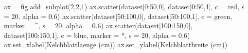 \documentclass[
  a4paper,
  DIV=11]{scrreprt}
\newenvironment{Shaded}{\begin{snugshade}}{\end{snugshade}}
\newcommand{\DecValTok}[1]{\textcolor[rgb]{0.68,0.00,0.00}{#1}}
\newcommand{\FloatTok}[1]{\textcolor[rgb]{0.68,0.00,0.00}{#1}}
\newcommand{\NormalTok}[1]{\textcolor[rgb]{0.00,0.23,0.31}{#1}}
\newcommand{\OperatorTok}[1]{\textcolor[rgb]{0.37,0.37,0.37}{#1}}
\newcommand{\StringTok}[1]{\textcolor[rgb]{0.13,0.47,0.30}{#1}}
\theoremstyle{definition}
\theoremstyle{definition}
\theoremstyle{remark}
\begin{document}
\begin{Shaded}
\begin{Highlighting}[]
\NormalTok{ax }\OperatorTok{=}\NormalTok{ fig.add\_subplot(}\DecValTok{2}\NormalTok{,}\DecValTok{2}\NormalTok{,}\DecValTok{1}\NormalTok{)}
\NormalTok{ax.scatter(dataset[}\DecValTok{0}\NormalTok{:}\DecValTok{50}\NormalTok{,}\DecValTok{0}\NormalTok{], dataset[}\DecValTok{0}\NormalTok{:}\DecValTok{50}\NormalTok{,}\DecValTok{1}\NormalTok{], }
\NormalTok{            c }\OperatorTok{=} \StringTok{\textquotesingle{}red\textquotesingle{}}\NormalTok{, s }\OperatorTok{=} \DecValTok{20}\NormalTok{, alpha }\OperatorTok{=} \FloatTok{0.6}\NormalTok{)}
\NormalTok{ax.scatter(dataset[}\DecValTok{50}\NormalTok{:}\DecValTok{100}\NormalTok{,}\DecValTok{0}\NormalTok{], dataset[}\DecValTok{50}\NormalTok{:}\DecValTok{100}\NormalTok{,}\DecValTok{1}\NormalTok{], }
\NormalTok{            c }\OperatorTok{=} \StringTok{\textquotesingle{}green\textquotesingle{}}\NormalTok{, marker }\OperatorTok{=} \StringTok{\textquotesingle{}\^{}\textquotesingle{}}\NormalTok{, s }\OperatorTok{=} \DecValTok{20}\NormalTok{, alpha }\OperatorTok{=} \FloatTok{0.6}\NormalTok{)}
\NormalTok{ax.scatter(dataset[}\DecValTok{100}\NormalTok{:}\DecValTok{150}\NormalTok{,}\DecValTok{0}\NormalTok{], dataset[}\DecValTok{100}\NormalTok{:}\DecValTok{150}\NormalTok{,}\DecValTok{1}\NormalTok{], }
\NormalTok{            c }\OperatorTok{=} \StringTok{\textquotesingle{}blue\textquotesingle{}}\NormalTok{, marker }\OperatorTok{=} \StringTok{\textquotesingle{}*\textquotesingle{}}\NormalTok{, s }\OperatorTok{=} \DecValTok{20}\NormalTok{, alpha }\OperatorTok{=} \FloatTok{0.6}\NormalTok{)}
\NormalTok{ax.set\_xlabel(}\StringTok{\textquotesingle{}Kelchblattlaenge (cm)\textquotesingle{}}\NormalTok{)}
\NormalTok{ax.set\_ylabel(}\StringTok{\textquotesingle{}Kelchblattbreite (cm)\textquotesingle{}}\NormalTok{)}


\end{Highlighting}
\end{Shaded}
\end{document}
